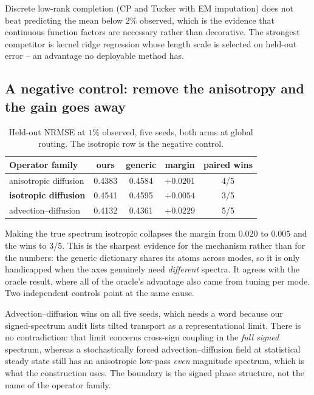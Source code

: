 Discrete low-rank completion (CP and Tucker with EM imputation) does not beat
predicting the mean below $2\%$ observed, which is the evidence that continuous
function factors are necessary rather than decorative.  The strongest competitor
is kernel ridge regression whose length scale is selected on held-out error -- an
advantage no deployable method has.

\subsection{A negative control: remove the anisotropy and the gain goes away}

\begin{table}[t]
  \centering
  \caption{Held-out NRMSE at $1\%$ observed, five seeds, both arms at global
  routing.  The isotropic row is the negative control.}
  \label{tab:operators}
  \small
  \begin{tabular}{lcccc}
    \toprule
    Operator family & ours & generic & margin & paired wins \\
    \midrule
    anisotropic diffusion  & 0.4383 & 0.4584 & $+0.0201$ & 4/5 \\
    \textbf{isotropic diffusion} & 0.4541 & 0.4595 & $\mathbf{+0.0054}$ & 3/5 \\
    advection--diffusion   & 0.4132 & 0.4361 & $+0.0229$ & 5/5 \\
    \bottomrule
  \end{tabular}
\end{table}

Making the true spectrum isotropic collapses the margin from $0.020$ to $0.005$
and the wins to 3/5.  This is the sharpest evidence for the mechanism rather than
for the numbers: the generic dictionary shares its atoms across modes, so it is
only handicapped when the axes genuinely need \emph{different} spectra.  It
agrees with the oracle result, where all of the oracle's advantage also came from
tuning per mode.  Two independent controls point at the same cause.

Advection--diffusion wins on all five seeds, which needs a word because our
signed-spectrum audit lists tilted transport as a representational limit.  There
is no contradiction: that limit concerns cross-sign coupling in the \emph{full
signed} spectrum, whereas a stochastically forced advection--diffusion field at
statistical steady state still has an anisotropic low-pass \emph{even} magnitude
spectrum, which is what the construction uses.  The boundary is the signed phase
structure, not the name of the operator family.

